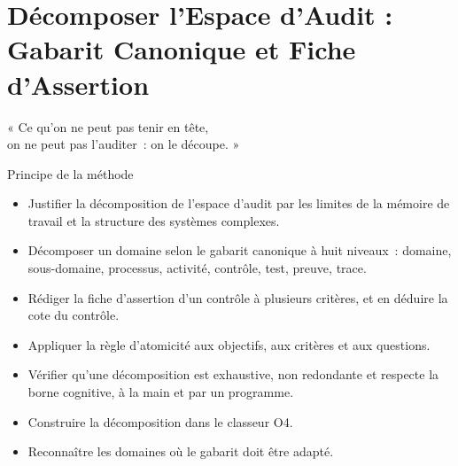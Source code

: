
\chapter[Décomposer l'Espace d'Audit]{Décomposer l'Espace d'Audit : Gabarit Canonique et Fiche d'Assertion}
\label{chap:decomposition}

\epigraph{%
    « Ce qu'on ne peut pas tenir en tête,\\
    on ne peut pas l'auditer~: on le découpe. »%
}{Principe de la méthode}


\begin{boxobjectifs}
\begin{itemize}
    \item Justifier la décomposition de l'espace d'audit par les limites de
          la mémoire de travail et la structure des systèmes complexes.
    \item Décomposer un domaine selon le gabarit canonique à huit niveaux~:
          domaine, sous-domaine, processus, activité, contrôle, test, preuve,
          trace.
    \item Rédiger la fiche d'assertion d'un contrôle à plusieurs critères, et
          en déduire la cote du contrôle.
    \item Appliquer la règle d'atomicité aux objectifs, aux critères et aux
          questions.
    \item Vérifier qu'une décomposition est exhaustive, non redondante et
          respecte la borne cognitive, à la main et par un programme.
    \item Construire la décomposition dans le classeur O4.
    \item Reconnaître les domaines où le gabarit doit être adapté.
\end{itemize}
\end{boxobjectifs}

